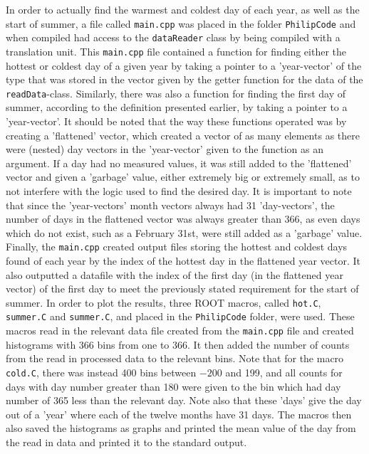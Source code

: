 \documentclass[a4, 12pt]{article}
\begin{document}
\indent In order to actually find the warmest and coldest day of each year, as well as the start of summer, a file called \texttt{main.cpp} was placed in the folder \texttt{PhilipCode} and when compiled had access to the \texttt{dataReader} class by being compiled with a translation unit. This \texttt{main.cpp} file contained a function for finding either the hottest or coldest day of a given year by taking a pointer to a 'year-vector' of the type that was stored in the vector given by the getter function for the data of the \texttt{readData}-class. Similarly, there was also a function for finding the first day of summer, according to the definition presented earlier, by taking a pointer to a 'year-vector'. It should be noted that the way these functions operated was by creating a 'flattened' vector, which created a vector of as many elements as there were (nested) day vectors in the 'year-vector' given to the function as an argument. If a day had no measured values, it was still added to the 'flattened' vector and given a 'garbage' value, either extremely big or extremely small, as to not interfere with the logic used to find the desired day. It is important to note that since the 'year-vectors' month vectors always had 31 'day-vectors', the number of days in the flattened vector was always greater than 366, as even days which do not exist, such as a February 31st, were still added as a 'garbage' value. Finally, the \texttt{main.cpp} created output files storing the hottest and coldest days found of each year by the index of the hottest day in the flattened year vector. It also outputted a datafile with the index of the first day (in the flattened year vector) of the first day to meet the previously stated requirement for the start of summer. \newline \indent
In order to plot the results, three ROOT macros, called \texttt{hot.C}, \texttt{summer.C} and \texttt{summer.C}, and placed in the \texttt{PhilipCode} folder, were used. These macros read in the relevant data file created from the \texttt{main.cpp} file and created histograms with 366 bins from one to 366. It then added the number of counts from the read in processed data to the relevant bins. Note that for the macro \texttt{cold.C}, there was instead 400 bins between $-200$ and 199, and all counts for days with day number greater than 180 were given to the bin which had day number of 365 less than the relevant day. Note also that these 'days' give the day out of a 'year' where each of the twelve months have 31 days. The macros then also saved the histograms as graphs and printed the mean value of the day from the read in data and printed it to the standard output. 
\end{document}
